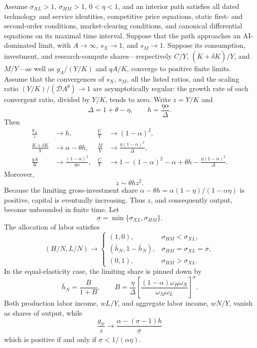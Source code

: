 \begin{conditionalresult}
\label{prop:axm-singular-limit}
Assume \(\sigma_{XL}>1\), \(\sigma_{HM}>1\), \(0<\eta<1\), and an
interior path satisfies all dated technology and service identities, competitive
price equations, static first- and second-order conditions, market-clearing
conditions, and canonical differential equations on its maximal time interval.
Suppose that the path approaches an AI-dominated limit, with \(A\to\infty\), \(s_X\to1\),
and \(s_M\to1\). Suppose its consumption, investment, and research-compute
shares---respectively \(C/Y\),
\((\dot K+\delta K)/Y\), and \(M/Y\)---as well as \(g_A/(Y/K)\) and \(qA/K\),
converge to positive finite limits.
Assume that the convergences of \(s_X\), \(s_M\), all the listed ratios, and the scaling ratio
\((Y/K)/(\mathcal D A^\theta)\to1\) are asymptotically regular: the growth rate
of each convergent ratio, divided by \(Y/K\), tends to zero. Write \(z=Y/K\) and
\[
 \Delta=1+\theta-\eta,\qquad
 h=\frac{\eta\alpha}{\Delta}.
\]
Then
\begin{align}
 \frac{g_A}{z}&\to h,&
 \frac{U}{Y}&\to(1-\alpha)^2,\\
 \frac{\dot K+\delta K}{Y}&\to\alpha-\theta h,&
 \frac{M}{Y}&\to\frac{\eta(1-\alpha)^2}{\Delta},\\
 \frac{qA}{K}&\to\frac{(1-\alpha)^2}{\eta\alpha},&
 \frac{C}{Y}&\to
 1-(1-\alpha)^2-\alpha+\theta h
 -\frac{\eta(1-\alpha)^2}{\Delta}.
 \label{eq:axm-singular-ratios}
\end{align}
Moreover,
\begin{equation}
 \dot z\sim\theta h z^2.
 \label{eq:axm-z-law}
\end{equation}
Because the limiting gross-investment share
\(\alpha-\theta h=\alpha(1-\eta)/(1-\alpha\eta)\) is positive, capital is
eventually increasing. Thus \(z\), and consequently output, become unbounded in
finite time.
Let
\[
 \underline\sigma=\min\{\sigma_{XL},\sigma_{HM}\}.
\]
The allocation of labor satisfies
\begin{equation}
 (H/N,L/N)\to
 \begin{cases}
  (1,0),&\sigma_{HM}<\sigma_{XL},\\
  (\bar h_N,1-\bar h_N),
      &\sigma_{HM}=\sigma_{XL}=\sigma,\\
  (0,1),&\sigma_{HM}>\sigma_{XL}.
 \end{cases}
 \label{eq:axm-singular-labor-allocation}
\end{equation}
In the equal-elasticity case, the limiting share is pinned down by
\begin{equation}
 \bar h_N=\frac{B}{1+B},\qquad
 B=\frac{\eta}{\Delta}
 \left[
  \frac{(1-\alpha)\omega_H\omega_X}{\omega_M\omega_L}
 \right]^{\sigma}.
 \label{eq:axm-singular-equal-elasticity-share}
\end{equation}
Both production labor income, \(wL/Y\), and aggregate labor income, \(wN/Y\),
vanish as shares of output, while
\begin{equation}
 \frac{g_w}{z}\to
 \frac{\alpha-(\underline\sigma-1)h}{\underline\sigma}
 \label{eq:axm-wage-limit}
\end{equation}
which is positive if and only if
\(\underline\sigma<1/(\alpha\eta)\).
\end{conditionalresult}

